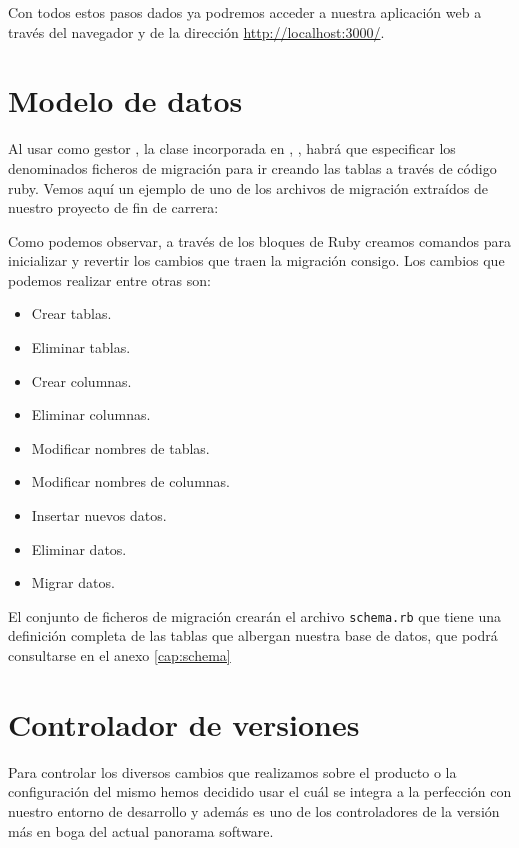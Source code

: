 Con todos estos pasos dados ya podremos acceder a nuestra aplicación web a
través del navegador y de la dirección \url{http://localhost:3000/}.

\section{Modelo de datos}
Al usar como gestor , la clase incorporada en ,
, habrá que especificar los denominados ficheros de
migración para ir creando las tablas a través de código ruby. Vemos aquí un
ejemplo de uno de los archivos de migración extraídos de nuestro proyecto de fin
de carrera:



Como podemos observar, a través de los bloques de Ruby creamos comandos para
inicializar y revertir los cambios que traen la migración consigo. Los cambios
que podemos realizar entre otras son:

\begin{itemize}
\item Crear tablas.
\item Eliminar tablas.
\item Crear columnas.
\item Eliminar columnas.
\item Modificar nombres de tablas.
\item Modificar nombres de columnas.
\item Insertar nuevos datos.
\item Eliminar datos.
\item Migrar datos.
\end{itemize}

El conjunto de ficheros de migración crearán el archivo \texttt{schema.rb} que
tiene una definición completa de las tablas que albergan nuestra base de datos,
que podrá consultarse en el anexo \ref{cap:schema}


\section{Controlador de versiones}
Para controlar los diversos cambios que realizamos sobre el producto o la
configuración del mismo hemos decidido usar  el cuál se integra a
la perfección con nuestro entorno de desarrollo  y además es uno
de los controladores de la versión más en boga del actual panorama software.

